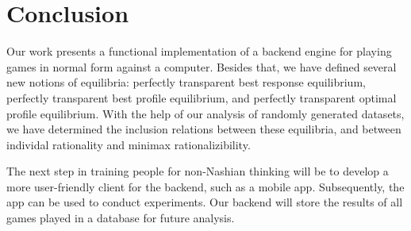 \chapter{Conclusion}
Our work presents a functional implementation of a backend engine for playing games in normal form against a computer.
Besides that, we have defined several new notions of equilibria: perfectly transparent best response equilibrium, perfectly transparent best profile equilibrium, and perfectly transparent optimal profile equilibrium.
With the help of our analysis of randomly generated datasets, we have determined the inclusion relations between these equilibria, and between individal rationality and minimax rationalizibility.

The next step in training people for non-Nashian thinking will be to develop a more user-friendly client for the backend, such as a mobile app.
Subsequently, the app can be used to conduct experiments.
Our backend will store the results of all games played in a database for future analysis.
